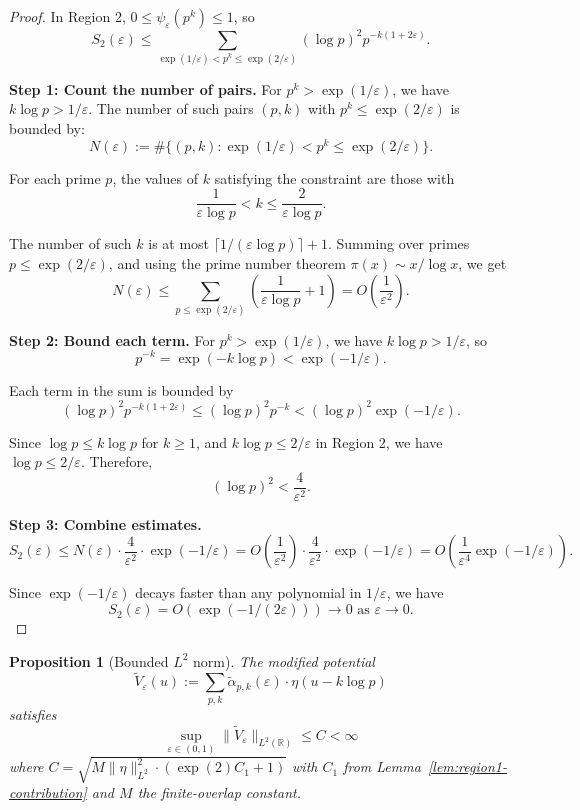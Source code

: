 ﻿\documentclass[12pt,a4paper]{article}
\newtheorem{proposition}[theorem]{Proposition}
\theoremstyle{definition}
\theoremstyle{remark}
\newcommand{\RR}{\mathbb{R}}
\begin{document}
\begin{proof}
In Region 2, $0 \leq \psi_\varepsilon(p^k) \leq 1$, so
\[
  S_2(\varepsilon) \leq \sum_{\exp(1/\varepsilon) < p^k \leq \exp(2/\varepsilon)} (\log p)^2 p^{-k(1+2\varepsilon)}.
\]

\textbf{Step 1: Count the number of pairs.}
For $p^k > \exp(1/\varepsilon)$, we have $k \log p > 1/\varepsilon$. The number of such pairs $(p,k)$ with $p^k \leq \exp(2/\varepsilon)$ is bounded by:
\[
  N(\varepsilon) := \#\{(p,k) : \exp(1/\varepsilon) < p^k \leq \exp(2/\varepsilon)\}.
\]

For each prime $p$, the values of $k$ satisfying the constraint are those with
\[
  \frac{1}{\varepsilon \log p} < k \leq \frac{2}{\varepsilon \log p}.
\]

The number of such $k$ is at most $\lceil 1/(\varepsilon \log p) \rceil + 1$. Summing over primes $p \leq \exp(2/\varepsilon)$, and using the prime number theorem $\pi(x) \sim x/\log x$, we get
\[
  N(\varepsilon) \leq \sum_{p \leq \exp(2/\varepsilon)} \left(\frac{1}{\varepsilon \log p} + 1\right) = O\left(\frac{1}{\varepsilon^2}\right).
\]

\textbf{Step 2: Bound each term.}
For $p^k > \exp(1/\varepsilon)$, we have $k \log p > 1/\varepsilon$, so
\[
  p^{-k} = \exp(-k \log p) < \exp(-1/\varepsilon).
\]

Each term in the sum is bounded by
\[
  (\log p)^2 p^{-k(1+2\varepsilon)} \leq (\log p)^2 p^{-k} < (\log p)^2 \exp(-1/\varepsilon).
\]

Since $\log p \leq k \log p$ for $k \geq 1$, and $k \log p \leq 2/\varepsilon$ in Region 2, we have $\log p \leq 2/\varepsilon$. Therefore,
\[
  (\log p)^2 < \frac{4}{\varepsilon^2}.
\]

\textbf{Step 3: Combine estimates.}
\[
  S_2(\varepsilon) \leq N(\varepsilon) \cdot \frac{4}{\varepsilon^2} \cdot \exp(-1/\varepsilon) = O\left(\frac{1}{\varepsilon^2}\right) \cdot \frac{4}{\varepsilon^2} \cdot \exp(-1/\varepsilon) = O\left(\frac{1}{\varepsilon^4} \exp(-1/\varepsilon)\right).
\]

Since $\exp(-1/\varepsilon)$ decays faster than any polynomial in $1/\varepsilon$, we have
\[
  S_2(\varepsilon) = O\left(\exp(-1/(2\varepsilon))\right) \to 0 \text{ as } \varepsilon \to 0.
\]
\end{proof}

\begin{proposition}[Bounded $L^2$ norm]\label{prop:modified-L2-bounded}
The modified potential
\[
  \widetilde{V}_\varepsilon(u) := \sum_{p,k} \widetilde{\alpha}_{p,k}(\varepsilon) \cdot \eta(u - k\log p)
\]
satisfies
\[
  \sup_{\varepsilon \in (0,1)} \|\widetilde{V}_\varepsilon\|_{L^2(\RR)} \leq C < \infty
\]
where $C = \sqrt{M \|\eta\|_{L^2}^2 \cdot (\exp(2) C_1 + 1)}$ with $C_1$ from Lemma~\ref{lem:region1-contribution} and $M$ the finite-overlap constant.
\end{proposition}
\end{document}
